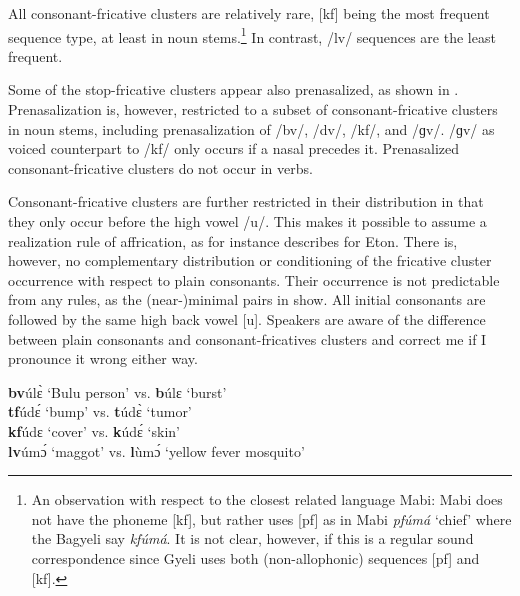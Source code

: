All consonant-fricative clusters are relatively rare, [kf] being the most frequent sequence type, at least in noun stems.\footnote{An observation with respect to the closest related language Mabi: Mabi does not have the phoneme [kf], but rather uses [pf] as in Mabi {\itshape pfúmá} `chief' where the Bagyeli say {\itshape kfúmá}. It is not clear, however, if this is a regular sound correspondence since Gyeli uses both (non-allophonic) sequences [pf] and [kf].} In contrast, /lv/ sequences are the least frequent.


Some of the stop-fricative clusters appear also prenasalized, as shown in . Prenasalization is, however, restricted to a subset of consonant-fricative clusters in noun stems, including prenasalization of /bv/, /dv/, /kf/, and /ɡv/. /ɡv/ as voiced counterpart to /kf/ only occurs if a nasal precedes it. Prenasalized consonant-fricative clusters do not occur in verbs.


Consonant-fricative clusters are further restricted in their distribution in that they only occur before the high vowel /u/.  This makes it possible to assume a realization rule of affrication, as for instance \citet[26]{velde2008} describes for Eton. There is, however, no complementary distribution or conditioning of the fricative cluster occurrence with respect to plain consonants. Their occurrence is not predictable from any rules, as the (near-)minimal pairs in  show. All initial consonants are followed by the same high back vowel [u]. Speakers are aware of the difference between plain consonants and consonant-fricatives clusters and correct me if I pronounce it wrong either way.

\ea \label{aff}
{\bfseries bv}úlɛ̀ `Bulu person' vs. {\bfseries b}úlɛ `burst' \\
{\bfseries tf}údɛ́ `bump' vs. {\bfseries t}údɛ̀ `tumor' \\
{\bfseries kf}údɛ `cover' vs. {\bfseries k}údɛ́ `skin' \\
{\bfseries lv}úmɔ́ `maggot' vs. {\bfseries l}ùmɔ́ `yellow fever mosquito' 
\z

